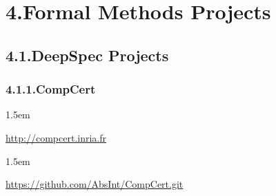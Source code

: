 \documentclass[12pt,twoside]{article}
\begin{document}
\section{4.\hspace*{0.5em}Formal Methods Projects}\label{sec-formal-methods-projects}%

\subsection{4.1.\hspace*{0.5em}DeepSpec Projects}\label{sec-deepspec-projects}%

\subsubsection{4.1.1.\hspace*{0.5em}CompCert}\label{sec-compcert}%

\begin{mddefinitions}%


\begin{mdbmarginx}{}{}{}{1.5em}%
\begin{mddefdata}%
\href{http://compcert.inria.fr}{{\ttfamily http://\hspace{0pt}compcert.\hspace{0pt}inria.\hspace{0pt}fr}}
\end{mddefdata}%
\end{mdbmarginx}%


\begin{mdbmarginx}{}{}{}{1.5em}%
\begin{mddefdata}%
\href{https://github.com/AbsInt/CompCert.git}{{\ttfamily https://\hspace{0pt}github.\hspace{0pt}com/\hspace{0pt}AbsInt/\hspace{0pt}CompCert.\hspace{0pt}git}}%
\end{mddefdata}%
\end{mdbmarginx}%
\end{mddefinitions}%
\end{document}
